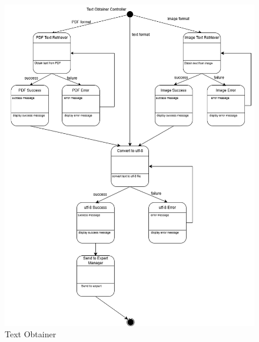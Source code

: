 \begin{figure}[H]
	\centering
	\includegraphics[width=\linewidth]{Section2/text_obtainer_state_diagram.png}
	\caption{Text Obtainer}
	\label{TextObtainer}
\end{figure}